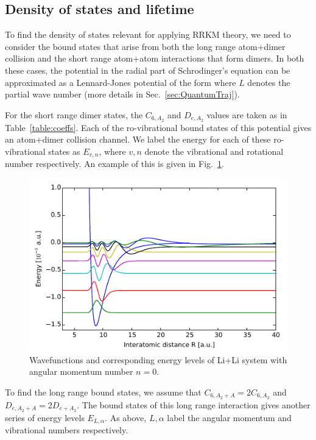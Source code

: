 \documentclass[%
 reprint,
 amsmath,amssymb,
 aps,
 nofootinbib
]{revtex4-1}
\begin{document}
\subsection{Density of states and lifetime}

To find the density of states relevant for applying RRKM theory, we need to consider the bound states that arise from both the long range atom+dimer collision and the short range atom+atom interactions that form dimers. In both these cases, the potential in the radial part of Schrodinger's equation can be approximated as a Lennard-Jones potential of the form
where $L$ denotes the partial wave number (more details in Sec.~\ref{sec:QuantumTraj}).

For the short range dimer states, the $C_{6,A_2}$ and $D_{e,A_2}$ values are taken as in Table~\ref{table:coeffs}. Each of the ro-vibrational bound states of this potential gives an atom+dimer collision channel. We label the energy for each of these ro-vibrational states as $E_{v,n}$, where $v,n$ denote the vibrational and rotational number respectively. An example of this is given in Fig.~\ref{fig:li_dimer_wavefunctions}.

\begin{figure}
\includegraphics{figures/li_li_n0_wavefunctions}
\caption{\label{fig:li_dimer_wavefunctions}Wavefunctions and corresponding energy levels of Li+Li system with angular momentum number $n=0$.}
\end{figure}

To find the long range bound states, we assume that $C_{6,A_2+A} = 2C_{6,A_2}$ and $D_{e,A_2+A}=2D_{e+A_2}$. The bound states of this long range interaction gives another series of energy levels $E_{L,\alpha}$. As above, $L,\alpha$ label the angular momentum and vibrational numbers respectively. 
\end{document}
